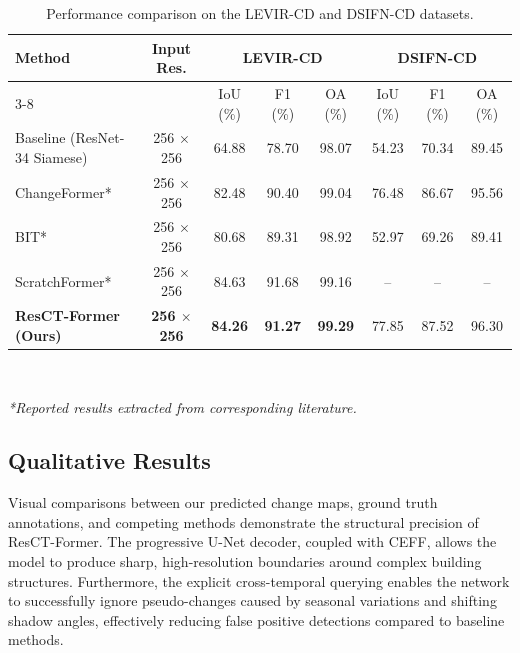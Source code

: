 \documentclass[conference]{IEEEtran}
\begin{document}
\begin{table}[htbp]
\centering
\caption{Performance comparison on the LEVIR-CD and DSIFN-CD datasets.}
\begin{tabular}{|l|c|ccc|ccc|}
\hline\hline

\multirow{2}{*}{\textbf{Method}}
& 
\multirow{2}{*}{\textbf{Input Res.}}
&
\multicolumn{3}{c|}{\textbf{LEVIR-CD}}
&
\multicolumn{3}{c|}{\textbf{DSIFN-CD}}
\\

\cline{3-8}

&
&
IoU (\%)
&
F1 (\%)
&
OA (\%)
&
IoU (\%)
&
F1 (\%)
&
OA (\%)
\\

\hline


Baseline (ResNet-34 Siamese)
&
256 $\times$ 256
&
64.88
&
78.70
&
98.07
&
54.23
&
70.34
&
89.45
\\

ChangeFormer* \cite{changeformer2022}
&
256 $\times$ 256
&
82.48
&
90.40
&
99.04
&
76.48
&
86.67
&
95.56
\\

BIT* \cite{bit2021}
&
256 $\times$ 256
&
80.68
&
89.31
&
98.92
&
52.97
&
69.26
&
89.41
\\

ScratchFormer* \cite{scratchformer2024}
&
256 $\times$ 256
&
84.63
&
91.68
&
99.16
&
--
&
--
&
--
\\

\hline\hline

\textbf{ResCT-Former (Ours)}
&
\textbf{256 $\times$ 256}
&
\textbf{84.26}
&
\textbf{91.27}
&
\textbf{99.29}
&
77.85
&
87.52
&
96.30
\\

\hline\hline

\end{tabular}
\\
\vspace{1ex}
\raggedright \textit{*Reported results extracted from corresponding literature.}
\label{tab:main_results}
\end{table}

\subsection{Qualitative Results}

Visual comparisons between our predicted change maps, ground truth annotations, and competing methods demonstrate the structural precision of ResCT-Former. The progressive U-Net decoder, coupled with CEFF, allows the model to produce sharp, high-resolution boundaries around complex building structures. Furthermore, the explicit cross-temporal querying enables the network to successfully ignore pseudo-changes caused by seasonal variations and shifting shadow angles, effectively reducing false positive detections compared to baseline methods.
\end{document}
